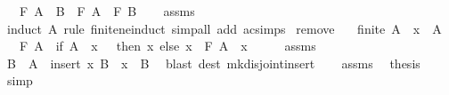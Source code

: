 \begin{isabellebody}
\ \ \ {\isachardoublequoteopen}F\ {\isacharparenleft}{\kern0pt}A\ {\isasymunion}\ B{\isacharparenright}{\kern0pt}\ {\isacharequal}{\kern0pt}\ F\ A\ \isactrlbold {\isacharasterisk}{\kern0pt}\ F\ B{\isachardoublequoteclose}\isanewline
%
\isadelimproof
\ \ %
\endisadelimproof
%
\isatagproof
{}\isamarkupfalse%
\ assms\ \isamarkupfalse%
\ {\isacharparenleft}{\kern0pt}induct\ A\ rule{\isacharcolon}{\kern0pt}\ finite{\isacharunderscore}{\kern0pt}ne{\isacharunderscore}{\kern0pt}induct{\isacharparenright}{\kern0pt}\ {\isacharparenleft}{\kern0pt}simp{\isacharunderscore}{\kern0pt}all\ add{\isacharcolon}{\kern0pt}\ ac{\isacharunderscore}{\kern0pt}simps{\isacharparenright}{\kern0pt}%
\endisatagproof
{\isafoldproof}%
%
\isadelimproof
\isanewline
%
\endisadelimproof
\isanewline
{}\isamarkupfalse%
\ remove{\isacharcolon}{\kern0pt}\isanewline
\ \ \ {\isachardoublequoteopen}finite\ A{\isachardoublequoteclose}\ \ {\isachardoublequoteopen}x\ {\isasymin}\ A{\isachardoublequoteclose}\isanewline
\ \ \ {\isachardoublequoteopen}F\ A\ {\isacharequal}{\kern0pt}\ {\isacharparenleft}{\kern0pt}if\ A\ {\isacharminus}{\kern0pt}\ {\isacharbraceleft}{\kern0pt}x{\isacharbraceright}{\kern0pt}\ {\isacharequal}{\kern0pt}\ {\isacharbraceleft}{\kern0pt}{\isacharbraceright}{\kern0pt}\ then\ x\ else\ x\ \isactrlbold {\isacharasterisk}{\kern0pt}\ F\ {\isacharparenleft}{\kern0pt}A\ {\isacharminus}{\kern0pt}\ {\isacharbraceleft}{\kern0pt}x{\isacharbraceright}{\kern0pt}{\isacharparenright}{\kern0pt}{\isacharparenright}{\kern0pt}{\isachardoublequoteclose}\isanewline
%
\isadelimproof
%
\endisadelimproof
%
\isatagproof
{}\isamarkupfalse%
\ {\isacharminus}{\kern0pt}\isanewline
\ \ \isamarkupfalse%
\ assms\ \isamarkupfalse%
\ B\ \ {\isachardoublequoteopen}A\ {\isacharequal}{\kern0pt}\ insert\ x\ B{\isachardoublequoteclose}\ \ {\isachardoublequoteopen}x\ {\isasymnotin}\ B{\isachardoublequoteclose}\ \isamarkupfalse%
\ {\isacharparenleft}{\kern0pt}blast\ dest{\isacharcolon}{\kern0pt}\ mk{\isacharunderscore}{\kern0pt}disjoint{\isacharunderscore}{\kern0pt}insert{\isacharparenright}{\kern0pt}\isanewline
\ \ \isamarkupfalse%
\ assms\ \isamarkupfalse%
\ {\isacharquery}{\kern0pt}thesis\ \isamarkupfalse%
\ simp\isanewline
{}\isamarkupfalse%
%
\endisatagproof
{\isafoldproof}%
%
\isadelimproof
\isanewline
%
\endisadelimproof
\isanewline
{}\isamarkupfalse%

\end{isabellebody}
